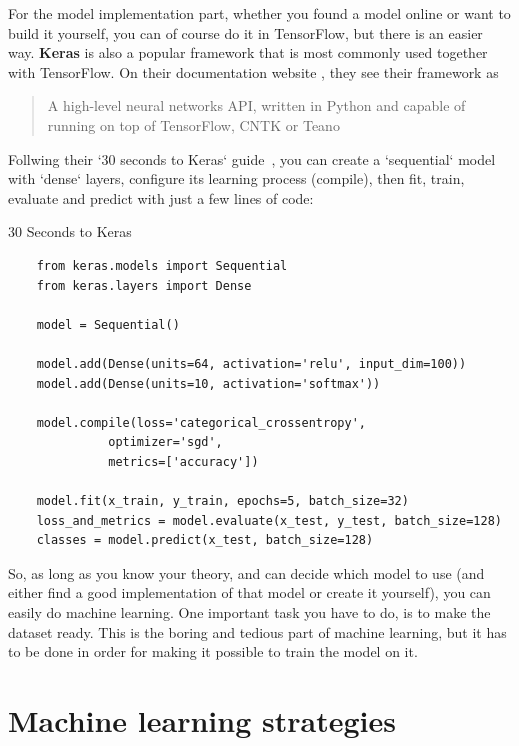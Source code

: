 For the model implementation part, whether you found a model online or want to build it yourself, you can of course do 
it in TensorFlow, but there is an easier way. \textbf{Keras} is also a popular framework that is most commonly used 
together with TensorFlow. On their documentation website \cite{keras_docs}, they see their framework as 
\blockquote{A high-level neural networks API, written in Python and capable of running on top of TensorFlow, CNTK or Teano}.

\newpage
\noindent Follwing their `30 seconds to Keras` guide \cite{keras_docs}, you can create a `sequential` model with `dense` 
layers, configure its learning process (compile), then fit, train, evaluate and predict with just a few lines of code: 

\begin{code}
\caption{30 Seconds to Keras}
\label{code:keras-guide}

\begin{verbatim}
    from keras.models import Sequential
    from keras.layers import Dense

    model = Sequential()

    model.add(Dense(units=64, activation='relu', input_dim=100))
    model.add(Dense(units=10, activation='softmax'))

    model.compile(loss='categorical_crossentropy',
              optimizer='sgd',
              metrics=['accuracy'])
    
    model.fit(x_train, y_train, epochs=5, batch_size=32)
    loss_and_metrics = model.evaluate(x_test, y_test, batch_size=128)
    classes = model.predict(x_test, batch_size=128)
\end{verbatim}
\end{code}

\noindent So, as long as you know your theory, and can decide which model to use (and either find a good 
implementation of that model or create it yourself), you can easily do machine learning. One important task 
you have to do, is to make the dataset ready. This is the boring and tedious part of machine learning, 
but it has to be done in order for making it possible to train the model on it. 


\section{Machine learning strategies}

